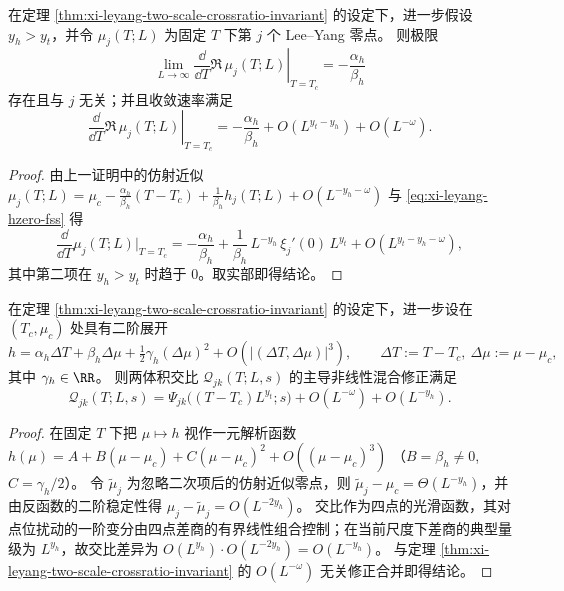 \begin{proposition}[零点轨迹给出临界切向混合比]\label{prop:xi-leyang-two-scale-crossratio-mixing-slope}
在定理 \ref{thm:xi-leyang-two-scale-crossratio-invariant} 的设定下，进一步假设 \(y_h>y_t\)，并令 \(\mu_j(T;L)\) 为固定 \(T\) 下第 \(j\) 个 Lee--Yang 零点。
则极限
\[
\lim_{L\to\infty}\left.\frac{\dd}{\dd T}\Re\,\mu_j(T;L)\right|_{T=T_c}
=
-\frac{\alpha_h}{\beta_h}
\]
存在且与 \(j\) 无关；并且收敛速率满足
\[
\left.\frac{\dd}{\dd T}\Re\,\mu_j(T;L)\right|_{T=T_c}
=
-\frac{\alpha_h}{\beta_h}
+O(L^{y_t-y_h})+O(L^{-\omega}).
\]
\end{proposition}
\begin{proof}
由上一证明中的仿射近似
\(
\mu_j(T;L)=\mu_c-\frac{\alpha_h}{\beta_h}(T-T_c)+\frac{1}{\beta_h}h_j(T;L)+O(L^{-y_h-\omega})
\)
与 \eqref{eq:xi-leyang-hzero-fss} 得
\[
\frac{\dd}{\dd T}\mu_j(T;L)\Big|_{T=T_c}
=
-\frac{\alpha_h}{\beta_h}
+\frac{1}{\beta_h}\,L^{-y_h}\,\xi_j'(0)\,L^{y_t}
+O(L^{y_t-y_h-\omega}),
\]
其中第二项在 \(y_h>y_t\) 时趋于 \(0\)。取实部即得结论。
\end{proof}

\begin{proposition}[二阶非线性混合在交比中的额外压制]\label{prop:xi-leyang-two-scale-crossratio-quadratic-mixing-suppression}
在定理 \ref{thm:xi-leyang-two-scale-crossratio-invariant} 的设定下，进一步设在 \((T_c,\mu_c)\) 处具有二阶展开
\[
h=\alpha_h\Delta T+\beta_h\Delta\mu+\tfrac12\gamma_h(\Delta\mu)^2+O(\lvert(\Delta T,\Delta\mu)\rvert^3),
\qquad
\Delta T:=T-T_c,\ \Delta\mu:=\mu-\mu_c,
\]
其中 \(\gamma_h\in\RR\)。
则两体积交比 \(\mathcal Q_{jk}(T;L,s)\) 的主导非线性混合修正满足
\[
\mathcal Q_{jk}(T;L,s)
=
\Psi_{jk}\!\bigl((T-T_c)L^{y_t};s\bigr)
+O(L^{-\omega})
+O(L^{-y_h}).
\]
\end{proposition}
\begin{proof}
在固定 \(T\) 下把 \(\mu\mapsto h\) 视作一元解析函数
\(
h(\mu)=A+B(\mu-\mu_c)+C(\mu-\mu_c)^2+O((\mu-\mu_c)^3)
\)
（\(B=\beta_h\neq 0\), \(C=\gamma_h/2\)）。
令 \(\tilde\mu_j\) 为忽略二次项后的仿射近似零点，则 \(\tilde\mu_j-\mu_c=\Theta(L^{-y_h})\)，并由反函数的二阶稳定性得 \(\mu_j-\tilde\mu_j=O(L^{-2y_h})\)。
交比作为四点的光滑函数，其对点位扰动的一阶变分由四点差商的有界线性组合控制；在当前尺度下差商的典型量级为 \(L^{y_h}\)，故交比差异为 \(O(L^{y_h})\cdot O(L^{-2y_h})=O(L^{-y_h})\)。
与定理 \ref{thm:xi-leyang-two-scale-crossratio-invariant} 的 \(O(L^{-\omega})\) 无关修正合并即得结论。
\end{proof}

